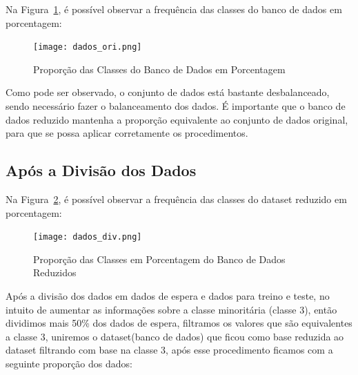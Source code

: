\documentclass[12pt,oneside,a4paper,chapter=TITLE,
			   english,brazil]{abntex2}
\begin{document}
Na Figura~\ref{fig:base}, é possível observar a frequência das classes do banco de dados em porcentagem:




\begin{figure}[H]
  \centering
   \caption[Proporção das Classes do Banco de Dados em Porcentagem]{Proporção das Classes do Banco de Dados em Porcentagem}
   \vspace{-1.5em}
  \texttt{[image: dados\_ori.png]}
  \label{fig:base}
\end{figure}
\begin{flushleft}
\vspace{-1.5em}
\centering
{}
\end{flushleft}

Como pode ser observado, o conjunto de dados está bastante desbalanceado, sendo necessário fazer o balanceamento dos dados. É importante que o banco de dados reduzido mantenha a proporção equivalente ao conjunto de dados original, para que se possa aplicar corretamente os procedimentos.  

\vspace{\onelineskip}
\subsection{Após a Divisão dos Dados}

\vspace{\onelineskip}

Na Figura~\ref{fig:reduzido}, é possível observar a frequência das classes do dataset reduzido em porcentagem:








\begin{figure}[H]
  \centering
    \caption[Proporção das Classes em Porcentagem do Banco de Dados Reduzidos]{Proporção das Classes em Porcentagem do Banco de Dados Reduzidos}
   \vspace{-1.5em}
  \texttt{[image: dados\_div.png]} 
  \label{fig:reduzido}
  \end{figure}
  \begin{flushleft}
\vspace{-2.2em}
\centering
{}
\end{flushleft}




Após a divisão dos dados em dados de espera e dados para treino e teste, no intuito de aumentar as informações sobre a classe minoritária (classe 3), então  dividimos mais  50\%  dos dados de espera, filtramos os valores que são equivalentes a classe 3, uniremos o dataset(banco de dados) que ficou como base reduzida ao dataset  filtrando com base na classe 3, após esse procedimento ficamos com  a seguinte proporção dos dados:
\end{document}
